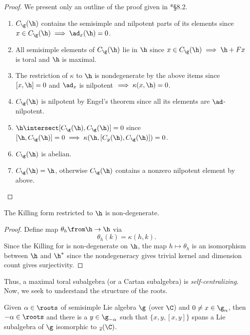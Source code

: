 \documentclass[11pt,leqno,oneside]{amsart}
\numberwithin{thm}{section}
\begin{document}
\begin{proof}
  We present only an outline of the proof given in \cite{humph}*{\S 8.2}.
  \begin{enumerate}
  \item \(C_\g(\h)\) contains the semisimple and nilpotent parts of
    its elements since \(x \in C_\g(\h) \implies \ad_x(\h) = 0\).
  \item All semisimple elements of \(C_\g(\h)\) lie in \(\h\) since
    \(x \in C_\g(\h) \implies \h+Fx\) is toral and \(\h\) is maximal.
  \item The restriction of \(\kappa\) to \(\h\) is nondegenerate by
    the above items since \([x,\h] = 0\) and \(\ad_x\) is nilpotent
    \(\implies \kappa(x,\h) = 0\).
  \item \(C_\g(\h)\) is nilpotent by Engel's theorem since all its
    elements are \(\ad\)-nilpotent. 
  \item \(\h \intersect [C_\g(\h), C_\g(\h)] = 0\) since
    \([\h,C_\g(\h)] = 0 \implies \kappa(\h,[C_g(\h),C_\g(\h)]) = 0\).
  \item \(C_\g(\h)\) is abelian.
  \item \(C_\g(\h) = \h\), otherwise \(C_\g(\h)\) contains a nonzero
    nilpotent element by above.
  \end{enumerate}
\end{proof}
\begin{cor}
  The Killing form restricted to \(\h\) is non-degenerate.
\end{cor}
\begin{proof}
  Define map \(\theta_h \from \h \to \h\) via \[
    \theta_h(k) = \kappa(h,k).
  \]
  Since the Killing for is non-degenerate on \(\h\), the map \(h
  \mapsto \theta_h\) is an isomorphism between \(\h\) and \(\h^*\)
  since the nondegeneracy gives trivial kernel and dimension count
  gives surjectivity.
\end{proof}
Thus, a maximal toral subalgebra (or a Cartan subalgebra) is
\emph{self-centralizing}. Now, we seek to understand the structure of
the roots.
\begin{lem}
  Given \(\alpha \in \roots\) of semisimple Lie algebra \(\g\) (over
  \(\C\)) and \(0
  \neq x \in \g_\alpha\), then \(-\alpha \in \roots\) and there is a
  \(y \in \g_{-\alpha}\) such that \(\{x,y,[x,y]\}\) spans a Lie
  subalgebra of \(\g\) isomorphic to \(\sl_2(\C)\).
\end{lem}
\end{document}
